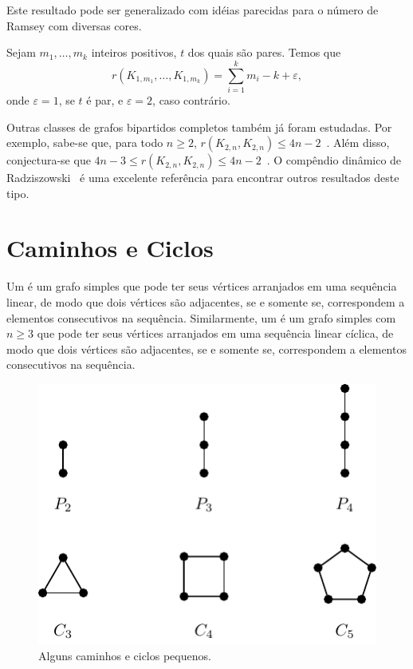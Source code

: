 Este resultado pode ser generalizado com idéias parecidas para o número de Ramsey com diversas cores.

\begin{noprooftheorem}
Sejam $m_1, \dots, m_k$ inteiros positivos, $t$ dos quais são pares. Temos que
\[r(K_{1,m_1}, \dotsc,  K_{1,m_k}) = \sum_{i=1}^{k} m_i  - k + \varepsilon,\]
onde $\varepsilon = 1$, se $t$ é par, e $\varepsilon = 2$, caso contrário.
\end{noprooftheorem}

Outras classes de grafos bipartidos completos também já foram estudadas. Por exemplo, sabe-se que, para todo $n\geq 2$, $r(K_{2,n}, K_{2,n}) \leq 4n -2$~\cite{exoo}. Além disso, conjectura-se que $4n - 3 \leq r(K_{2,n}, K_{2,n}) \leq 4n -2$~\cite{lortz2002ramsey}.
O compêndio dinâmico de Radziszowski~\cite{small_ramsey} é uma excelente referência para encontrar outros resultados deste tipo.


\section{Caminhos e Ciclos}

Um  é um grafo simples que pode ter seus vértices arranjados em uma sequência linear, de modo que dois vértices são adjacentes, se e somente se, correspondem a elementos consecutivos na sequência. Similarmente, um  é um grafo simples com $n \geq 3$ que pode ter seus vértices arranjados em uma sequência linear cíclica, de modo que dois vértices são adjacentes, se e somente se, correspondem a elementos consecutivos na sequência.

\begin{figure}[ht!]
\centering
\includegraphics{figures/3_graph_2_cyclepath}
\caption{Alguns caminhos e ciclos pequenos.}
\label{graph:fig:cyclepath}
\end{figure}

